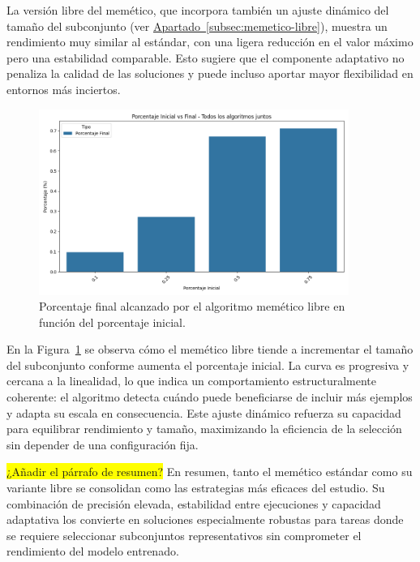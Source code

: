 La versión libre del memético, que incorpora también un ajuste dinámico del tamaño del subconjunto 
(ver \hyperref[subsec:memetico-libre]{Apartado~\ref*{subsec:memetico-libre}}), muestra un rendimiento muy similar al estándar, 
con una ligera reducción en el valor máximo pero una estabilidad comparable.
Esto sugiere que el componente adaptativo no penaliza la calidad de las soluciones y puede incluso aportar mayor flexibilidad en entornos más inciertos.

\begin{figure}[H]
\centering
\includegraphics[width=0.9\textwidth]{imagenes/evaluaciones/libres/porcentaje-inicial-vs-final-por-pi_memetico-libre}
\caption{Porcentaje final alcanzado por el algoritmo memético libre en función del porcentaje inicial.}
\label{fig:memetico_porcentaje}
\end{figure}

En la Figura~\ref{fig:memetico_porcentaje} se observa cómo el memético libre tiende a incrementar el tamaño del subconjunto conforme aumenta el porcentaje inicial.
La curva es progresiva y cercana a la linealidad, lo que indica un comportamiento estructuralmente coherente: 
el algoritmo detecta cuándo puede beneficiarse de incluir más ejemplos y adapta su escala en consecuencia.
Este ajuste dinámico refuerza su capacidad para equilibrar rendimiento y tamaño, maximizando la eficiencia de la selección sin depender de una configuración fija.

\colorbox{yellow}{¿Añadir el párrafo de resumen?}
En resumen, tanto el memético estándar como su variante libre se consolidan como las estrategias más eficaces del estudio.
Su combinación de precisión elevada, estabilidad entre ejecuciones y capacidad adaptativa los convierte en soluciones 
especialmente robustas para tareas donde se requiere seleccionar subconjuntos representativos sin comprometer el rendimiento del modelo entrenado.


